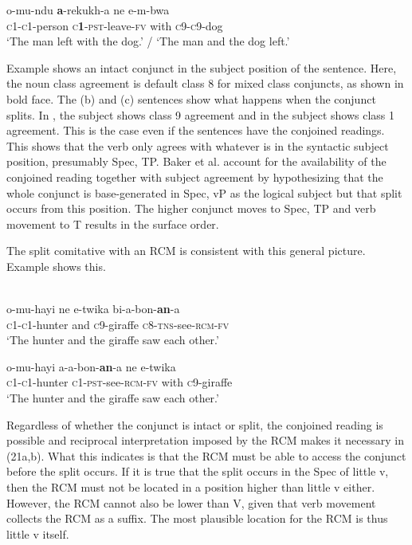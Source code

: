 \documentclass[output=paper]{langsci/langscibook}
\begin{document}
\ex\label{ex:safir:20c}
\gll   o-mu-ndu   \textbf{a}-rekukh-a     ne   e-m-bwa\\
       \textsc{c1-c1}-person   \textsc{c}\textbf{1}-\textsc{pst}-leave-\textsc{fv}   with   \textsc{c9-c9}-dog\\
\glt   ‘The man left with the dog.’ / ‘The man and the dog left.’
\z
\z

Example  shows an intact conjunct in the subject position of the sentence. Here, the noun class agreement is default class 8 for mixed class conjuncts, as shown in bold face. The (b) and (c) sentences show what happens when the conjunct splits. In , the subject shows class 9 agreement and in  the subject shows class 1 agreement. This is the case even if the sentences have the conjoined readings. This shows that the verb only agrees with whatever is in the syntactic subject position, presumably Spec, TP. Baker et al. account for the availability of the conjoined reading together with subject agreement by hypothesizing that the whole conjunct is base-generated in Spec, vP as the logical subject but that split occurs from this position. The higher conjunct moves to Spec, TP and verb movement to T results in the surface order.  

The split comitative with an RCM is consistent with this general picture. Example  shows this.


\ea\label{ex:safir:21}
  \\
\ea\label{ex:safir:21a}
\gll  o-mu-hayi   ne   e-twika   bi-a-bon-\textbf{an}-a  \\
       \textsc{c1-c1}-hunter   and   \textsc{c}9-giraffe   \textsc{c8-tns}-see-\textsc{rcm}\textsc{-fv} \\
\glt   ‘The hunter and the giraffe saw each other.’

\ex\label{ex:safir:21b}
\gll   o-mu-hayi     a-a-bon-\textbf{an}-a     ne   e-twika\\
       \textsc{c1-c1}-hunter    \textsc{c1-pst}-see-\textsc{rcm}\textsc{-fv}  with  \textsc{c}9-giraffe   \\
\glt   ‘The hunter and the giraffe saw each other.’
\z
\z

Regardless of whether the conjunct is intact or split, the conjoined reading is possible and reciprocal interpretation imposed by the RCM makes it necessary in (21a,b). What this indicates is that the RCM must be able to access the conjunct before the split occurs. If it is true that the split occurs in the Spec of little v, then the RCM must not be located in a position higher than little v either. However, the RCM cannot also be lower than V, given that verb movement collects the RCM as a suffix. The most plausible location for the RCM is thus little v itself. 
\end{document}
